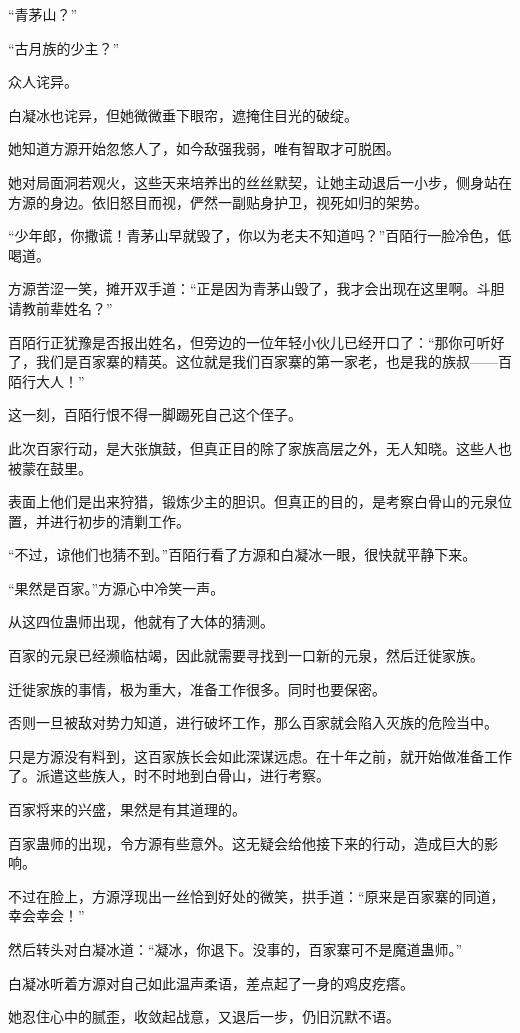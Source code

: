 \begin{this_body}
“青茅山？”

“古月族的少主？”

众人诧异。

白凝冰也诧异，但她微微垂下眼帘，遮掩住目光的破绽。

她知道方源开始忽悠人了，如今敌强我弱，唯有智取才可脱困。

她对局面洞若观火，这些天来培养出的丝丝默契，让她主动退后一小步，侧身站在方源的身边。依旧怒目而视，俨然一副贴身护卫，视死如归的架势。

“少年郎，你撒谎！青茅山早就毁了，你以为老夫不知道吗？”百陌行一脸冷色，低喝道。

方源苦涩一笑，摊开双手道：“正是因为青茅山毁了，我才会出现在这里啊。斗胆请教前辈姓名？”

百陌行正犹豫是否报出姓名，但旁边的一位年轻小伙儿已经开口了：“那你可听好了，我们是百家寨的精英。这位就是我们百家寨的第一家老，也是我的族叔——百陌行大人！”

这一刻，百陌行恨不得一脚踢死自己这个侄子。

此次百家行动，是大张旗鼓，但真正目的除了家族高层之外，无人知晓。这些人也被蒙在鼓里。

表面上他们是出来狩猎，锻炼少主的胆识。但真正的目的，是考察白骨山的元泉位置，并进行初步的清剿工作。

“不过，谅他们也猜不到。”百陌行看了方源和白凝冰一眼，很快就平静下来。

“果然是百家。”方源心中冷笑一声。

从这四位蛊师出现，他就有了大体的猜测。

百家的元泉已经濒临枯竭，因此就需要寻找到一口新的元泉，然后迁徙家族。

迁徙家族的事情，极为重大，准备工作很多。同时也要保密。

否则一旦被敌对势力知道，进行破坏工作，那么百家就会陷入灭族的危险当中。

只是方源没有料到，这百家族长会如此深谋远虑。在十年之前，就开始做准备工作了。派遣这些族人，时不时地到白骨山，进行考察。

百家将来的兴盛，果然是有其道理的。

百家蛊师的出现，令方源有些意外。这无疑会给他接下来的行动，造成巨大的影响。

不过在脸上，方源浮现出一丝恰到好处的微笑，拱手道：“原来是百家寨的同道，幸会幸会！”

然后转头对白凝冰道：“凝冰，你退下。没事的，百家寨可不是魔道蛊师。”

白凝冰听着方源对自己如此温声柔语，差点起了一身的鸡皮疙瘩。

她忍住心中的腻歪，收敛起战意，又退后一步，仍旧沉默不语。


\end{this_body}
